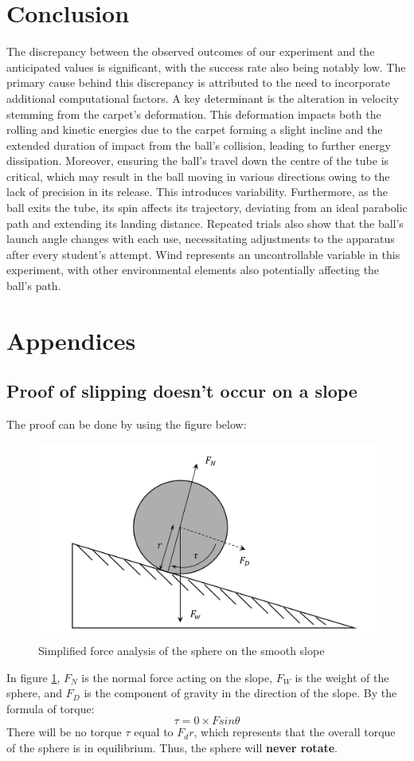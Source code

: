 \documentclass{article}
\begin{document}
    \section{Conclusion}
        The discrepancy between the observed outcomes of our experiment and the anticipated values is significant, with the success rate also being notably low. The primary cause behind this discrepancy is attributed to the need to incorporate additional computational factors. A key determinant is the alteration in velocity stemming from the carpet's deformation. This deformation impacts both the rolling and kinetic energies due to the carpet forming a slight incline and the extended duration of impact from the ball's collision, leading to further energy dissipation. Moreover, ensuring the ball's travel down the centre of the tube is critical, which may result in the ball moving in various directions owing to the lack of precision in its release. This introduces variability. Furthermore, as the ball exits the tube, its spin affects its trajectory, deviating from an ideal parabolic path and extending its landing distance. Repeated trials also show that the ball's launch angle changes with each use, necessitating adjustments to the apparatus after every student's attempt. Wind represents an uncontrollable variable in this experiment, with other environmental elements also potentially affecting the ball's path.
\newpage
\appendix
\section{Appendices}
    \subsection{Proof of slipping doesn't occur on a slope} \label{ap:proofofslide}
        The proof can be done by using the figure below:
        \begin{figure}[H]
            \centering
            \includegraphics[width=0.5\linewidth]{no_friction.png}
            \caption{Simplified force analysis of the sphere on the smooth slope}
            \label{frictionless}
        \end{figure}
        In figure \ref{frictionless}, $F_N$ is the normal force acting on the slope, $F_W$ is the weight of the sphere, and $F_D$ is the component of gravity in the direction of the slope.
        By the formula of torque:
        \begin{equation}
            \tau = 0\times Fsin\theta
        \end{equation}
        There will be no torque $\tau$ equal to $F_dr$, which represents that the overall torque of the sphere is in equilibrium. Thus, the sphere will \textbf{never rotate}.
\end{document}
